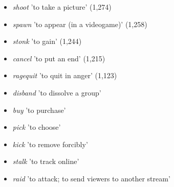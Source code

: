 \documentclass[output=paper]{langscibook}
\begin{document}
\begin{itemize}
\begin{styleListParagraph}
\textit{clip} 'to record videogame clips' (1,298)
\end{styleListParagraph}
\item \begin{styleListParagraph}
\textit{shoot} {}'to take a picture' (1,274)
\end{styleListParagraph}
\item \begin{styleListParagraph}
\textit{spawn} 'to appear (in a videogame)' (1,258)
\end{styleListParagraph}
\item \begin{styleListParagraph}
\textit{stonk} 'to gain' (1,244)
\end{styleListParagraph}
\item \begin{styleListParagraph}
\textit{cancel} {}'to put an end' (1,215)
\end{styleListParagraph}
\item \begin{styleListParagraph}
\textit{ragequit} 'to quit in anger' (1,123)
\end{styleListParagraph}
\item \begin{styleListParagraph}
\textit{disband} 'to dissolve a group' 
\end{styleListParagraph}
\item \begin{styleListParagraph}
\textit{buy} 'to purchase' 
\end{styleListParagraph}
\item \begin{styleListParagraph}
\textit{pick} 'to choose' 
\end{styleListParagraph}
\item \begin{styleListParagraph}
\textit{kick} 'to remove forcibly' 
\end{styleListParagraph}
\item \begin{styleListParagraph}
\textit{stalk} 'to track online' 
\end{styleListParagraph}
\item \begin{styleListParagraph}
\textit{raid} 'to attack; to send viewers to another stream' 
\end{styleListParagraph}

\end{itemize}
\end{document}
